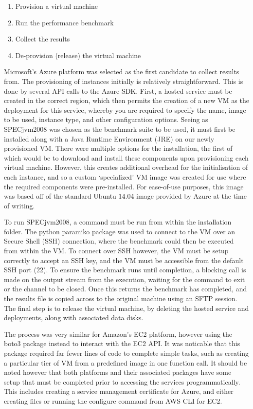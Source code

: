 \documentclass[conference]{IEEEtran}
\begin{document}
\begin{enumerate}
  \item Provision a virtual machine
  \item Run the performance benchmark
  \item Collect the results
  \item De-provision (release) the virtual machine
\end{enumerate}

Microsoft's Azure platform was selected as the first candidate to collect results from. The provisioning of instances initially is relatively straightforward. This is done by several API calls to the Azure SDK. First, a hosted service must be created in the correct region, which then permits the creation of a new VM as the deployment for this service, whereby you are required to specify the name, image to be used, instance type, and other configuration options. Seeing as SPECjvm2008 was chosen as the benchmark suite to be used, it must first be installed along with a Java Runtime Environment (JRE) on our newly provisioned VM. There were multiple options for the installation, the first of which would be to download and install these components upon provisioning each virtual machine. However, this creates additional overhead for the initialisation of each instance, and so a custom `specialized' VM image \cite{azurevmimage} was created for use where the required components were pre-installed. For ease-of-use purposes, this image was based off of the standard Ubuntu 14.04 image provided by Azure at the time of writing.

To run SPECjvm2008, a command must be run from within the installation folder. The python paramiko package was used to connect to the VM over an Secure Shell (SSH) connection, where the benchmark could then be executed from within the VM. To connect over SSH however, the VM must be setup correctly to accept an SSH key, and the VM must be accessible from the default SSH port (22). To ensure the benchmark runs until completion, a blocking call is made on the output stream from the execution, waiting for the command to exit or the channel to be closed. Once this returns the benchmark has completed, and the results file is copied across to the original machine using an SFTP session. The final step is to release the virtual machine, by deleting the hosted service and deployments, along with associated data disks.

The process was very similar for Amazon's EC2 platform, however using the boto3 package instead to interact with the EC2 API. It was noticable that this package required far fewer lines of code to complete simple tasks, such as creating a particular tier of VM from a predefined image in one function call. It should be noted however that both platforms and their associated packages have some setup that must be completed prior to accessing the services programmatically. This includes creating a service management certificate for Azure, and either creating files or running the configure command from AWS CLI for EC2.
\end{document}
